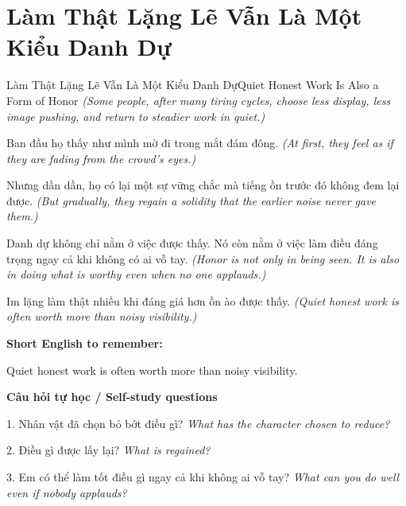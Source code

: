 \section{Làm Thật Lặng Lẽ Vẫn Là Một Kiểu Danh Dự}
\begin{truyen}{Làm Thật Lặng Lẽ Vẫn Là Một Kiểu Danh Dự}{Quiet Honest Work Is Also a Form of Honor}
\textit{(Some people, after many tiring cycles, choose less display, less image pushing, and return to steadier work in quiet.)}

Ban đầu họ thấy như mình mờ đi trong mắt đám đông.
\textit{(At first, they feel as if they are fading from the crowd's eyes.)}

Nhưng dần dần, họ có lại một sự vững chắc mà tiếng ồn trước đó không đem lại được.
\textit{(But gradually, they regain a solidity that the earlier noise never gave them.)}

Danh dự không chỉ nằm ở việc được thấy. Nó còn nằm ở việc làm điều đáng trọng ngay cả khi không có ai vỗ tay.
\textit{(Honor is not only in being seen. It is also in doing what is worthy even when no one applauds.)}

\end{truyen}

\begin{baihoc}
Im lặng làm thật nhiều khi đáng giá hơn ồn ào được thấy.
\textit{(Quiet honest work is often worth more than noisy visibility.)}
\end{baihoc}

\begin{ghinhoanh}
\textbf{Short English to remember:}

Quiet honest work is often worth more than noisy visibility.

\end{ghinhoanh}

\begin{tuhocnhanh}
\textbf{Câu hỏi tự học / Self-study questions}

1. Nhân vật đã chọn bỏ bớt điều gì? \textit{What has the character chosen to reduce?}

2. Điều gì được lấy lại? \textit{What is regained?}

3. Em có thể làm tốt điều gì ngay cả khi không ai vỗ tay? \textit{What can you do well even if nobody applauds?}
\end{tuhocnhanh}
